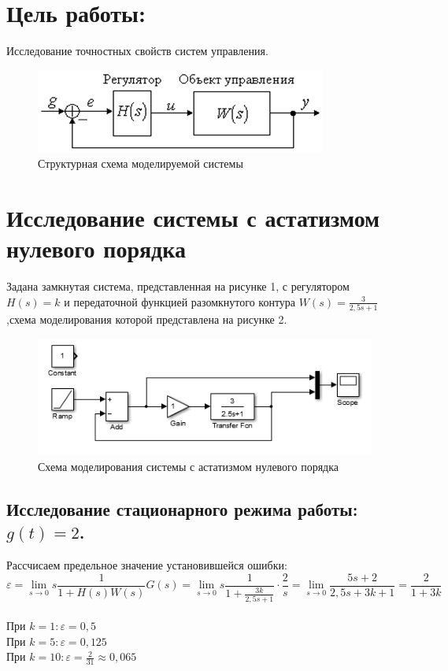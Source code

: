 \documentclass[a4paper, 11pt, russian]{article}
\begin{document}
    

    \section*{Цель работы:}
    Исследование точностных свойств систем управления.

    \begin{figure}[h!]
        \centering
        \includegraphics{0ast.png}
        \caption{Структурная схема моделируемой системы}
    \end{figure}

    \section{Исследование системы с астатизмом нулевого порядка}
    Задана замкнутая система, представленная на рисунке 1, с регулятором $H(s) = k$ и передаточной функцией разомкнутого контура $W(s)=\displaystyle{\frac{3}{2,5s + 1}}$,схема моделирования которой представлена на рисунке 2.
    
    \begin{figure}[h!]
        \centering
        \includegraphics{0astScheme.PNG}
        \caption{Схема моделирования системы с астатизмом нулевого порядка}
    \end{figure}
    \subsection{Исследование стационарного режима работы: $g(t) = 2$.}
    Рассчисаем предельное значение установившейся ошибки: $$\varepsilon = \lim_{s\to0} s\frac{1}{1 + H(s)W(s)}G(s) = \lim_{s\to0} s\frac{1}{1 + \frac{3k}{2,5s + 1}}\cdot\frac{2}{s} = \lim_{s\to0} \frac{5s + 2}{2,5s + 3k + 1} = \frac{2}{1 + 3k}$$\\
    При $k = 1: \varepsilon = 0,5$\\
    При $k = 5: \varepsilon = 0,125$\\
    При $k = 10: \varepsilon = \displaystyle{\frac{2}{31}} \approx 0,065$\\
    
\end{document}
